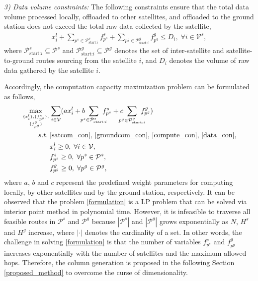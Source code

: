 \documentclass[journal,10pt]{IEEEtran}
\begin{document}
\textit{3) Data volume constraints:} The following constraints ensure that the total data volume processed locally, offloaded to other satellites, and offloaded to the ground station does not exceed the total raw data collected by the satellite,
\begin{equation}
\begin{aligned}
\label{data_con}
x^l_i + \!\!\! \sum_{p^s \in \mathcal{P}^s_{\text{start:}i}} \!\!\!\!\! f^s_{p^s} + \!\!\! \sum_{p^g \in \mathcal{P}^g_{\text{start:}i}} \!\!\!\!\! f^g_{p^g} \leq D_i, \; \forall i \in \mathcal{V}^s,
\end{aligned} 
\end{equation} 
where $\mathcal{P}^s_{\text{start:}i} \subseteq \mathcal{P}^s$ and $\mathcal{P}^g_{\text{start:}i} \subseteq \mathcal{P}^g$ denotes the set of inter-satellite and satellite-to-ground routes sourcing from the satellite $i$, and $D_i$ denotes the volume of raw data gathered by the satellite $i$.

Accordingly, the computation capacity maximization problem can be formulated as follows,
\begin{subequations}
\label{formulation}
\begin{align}
\max_{\{x^l_i\},\{f^s_{p^s}\}, \atop \{f^g_{p^g}\}} & \sum_{i \in \mathcal{V}} ( a x^l_i + b \!\!\!\!\! \sum_{p^s \in \mathcal{P}^s_{\text{start:}i}} \!\!\!\!\! f^s_{p^s} + c \!\!\!\!\! \sum_{p^g \in \mathcal{P}^g_{\text{start:}i}} \!\!\!\!\! f^g_{p^g})  \label{Obj} \\
s.t. \;
& \eqref{satcom_con},\, \eqref{groundcom_con}, \,\eqref{compute_con}, \,\eqref{data_con}, \\
&  x^l_i \geq 0, \; \forall i \in \mathcal{V}, \\
&  f^s_{p^s} \geq 0, \; \forall p^s \in \mathcal{P}^s, \\
&  f^g_{p^g} \geq 0, \; \forall p^g \in \mathcal{P}^g, 
\end{align}
\end{subequations}where $a$, $b$ and $c$ represent the predefined weight parameters for computing locally, by other satellites and by the ground station, respectively. It can be observed that the problem \eqref{formulation} is a LP problem that can be solved via interior point method in polynomial time. However, it is infeasible to traverse all feasible routes in $\mathcal{P}^s$ and $\mathcal{P}^g$ because $|\mathcal{P}^s|$ and $|\mathcal{P}^g|$ grows exponentially as $N$, $H^s$ and $H^g$ increase, where $|\cdot|$ denotes the cardinality of a set. In other words, the challenge in solving \eqref{formulation} is that the number of variables $f^s_{p^s}$ and $f^g_{p^g}$ increases exponentially with the number of satellites and the maximum allowed hops. Therefore, the column generation is proposed in the following Section \ref{proposed_method} to overcome the curse of dimensionality. 
\end{document}
